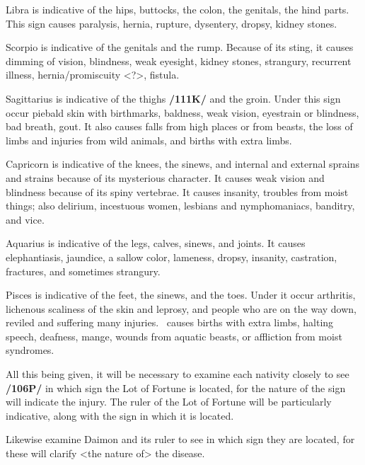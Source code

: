 Libra \mn{\Libra} is indicative of the hips, buttocks, the colon, the genitals, the hind parts. This sign causes
paralysis, hernia, rupture, dysentery, dropsy, kidney stones.

Scorpio \mn{\Scorpio} is indicative of the genitals and the rump. Because of its sting, it causes dimming of vision, blindness, weak eyesight, kidney stones, strangury, recurrent illness, hernia/promiscuity <?>, fistula.

Sagittarius \mn{\Sagittarius} is indicative of the thighs \textbf{/111K/} and the groin. Under this sign occur piebald skin with birthmarks, baldness, weak vision, eyestrain or blindness, bad breath, gout. It also causes falls from high
places or from beasts, the loss of limbs and injuries from wild animals, and births with extra limbs.

Capricorn \mn{\Capricorn} is indicative of the knees, the sinews, and internal and external sprains and strains because of its mysterious character. It causes weak vision and blindness because of its spiny vertebrae. It causes insanity, troubles from moist things; also delirium, incestuous women, lesbians and nymphomaniacs, banditry, and vice.

Aquarius \mn{\Aquarius} is indicative of the legs, calves, sinews, and joints. It causes elephantiasis, jaundice, a sallow color, lameness, dropsy, insanity, castration, fractures, and sometimes strangury.

Pisces \mn{\Pisces} is indicative of the feet, the sinews, and the toes. Under it occur arthritis, lichenous scaliness of the skin and leprosy, and people who are on the way down, reviled and suffering many injuries. \Pisces\, causes births with extra limbs, halting speech, deafness, mange, wounds from aquatic beasts, or affliction from moist syndromes.

All this being given, it will be necessary to examine each nativity closely to see \textbf{/106P/} in which sign the Lot of Fortune is located, for the nature of the sign will indicate the injury. The ruler of the Lot of Fortune will be particularly indicative, along with the sign in which it is located. 

Likewise examine Daimon and its ruler to see in which sign they are located, for these will clarify <the nature of> the disease.


